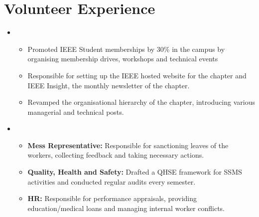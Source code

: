 \section{Volunteer Experience}
\vspace{5pt}

\begin{itemize}
    
    \item{
        {    
        \begin{itemize}
            \item Promoted IEEE Student memberships by 30\% in the campus by organising membership drives, workshops and technical events 
            \item Responsible for setting up the IEEE hosted website for the chapter and IEEE Insight, the monthly newsletter of the chapter.
            \item Revamped the organisational hierarchy of the chapter, introducing various managerial and technical posts.
        \end{itemize}
        }
    }
    
    \vspace{5pt}
    
    \item{
        {    
        \begin{itemize}
            \item \textbf{Mess Representative:} Responsible for sanctioning leaves of the workers, collecting feedback and taking necessary actions.
            \item \textbf{Quality, Health and Safety:} Drafted a QHSE framework for SSMS activities and conducted regular audits every semester.
            \item \textbf{HR:} Responsible for performance appraisals, providing education/medical loans and managing internal worker conflicts.
        \end{itemize}
        }
    }
    
    \vspace{5pt}

\end{itemize}